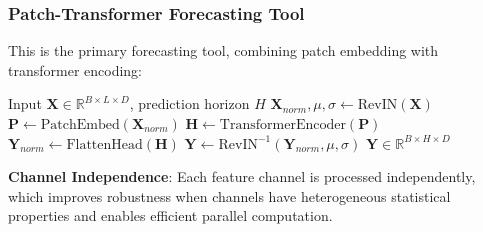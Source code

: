 \begin{table}[h]
\centering
\caption{Forecasting Tools Overview}
\label{tab:forecasting_tools}
\end{table}

\subsubsection{Patch-Transformer Forecasting Tool}
This is the primary forecasting tool, combining patch embedding with transformer encoding:

\begin{algorithm}[H]
\caption{Patch-Transformer Forecasting}
\label{alg:patch_forecast}
\begin{algorithmic}[1]
\REQUIRE Input $\mathbf{X} \in \mathbb{R}^{B \times L \times D}$, prediction horizon $H$
\STATE $\mathbf{X}_{norm}, \mu, \sigma \leftarrow \text{RevIN}(\mathbf{X})$ 
\STATE $\mathbf{P} \leftarrow \text{PatchEmbed}(\mathbf{X}_{norm})$ 
\STATE $\mathbf{H} \leftarrow \text{TransformerEncoder}(\mathbf{P})$ 
\STATE $\mathbf{Y}_{norm} \leftarrow \text{FlattenHead}(\mathbf{H})$ 
\STATE $\mathbf{Y} \leftarrow \text{RevIN}^{-1}(\mathbf{Y}_{norm}, \mu, \sigma)$ 
\RETURN $\mathbf{Y} \in \mathbb{R}^{B \times H \times D}$
\end{algorithmic}
\end{algorithm}

\textbf{Channel Independence}: Each feature channel is processed independently, which improves robustness when channels have heterogeneous statistical properties and enables efficient parallel computation.

